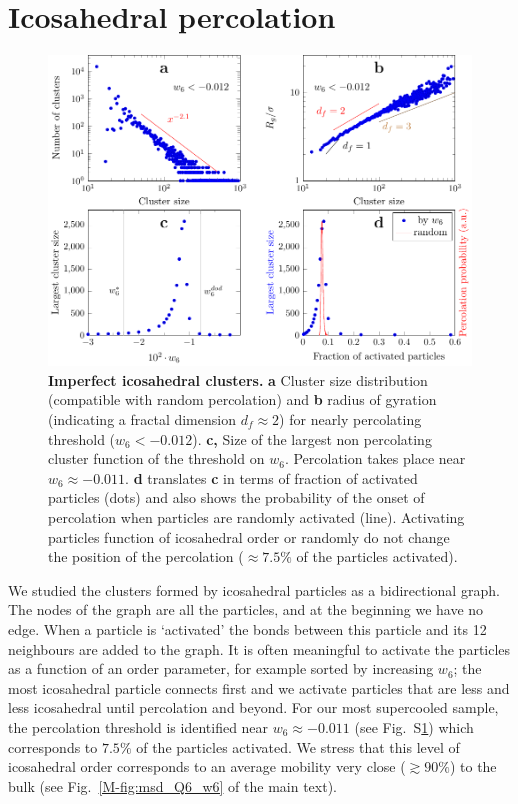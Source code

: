 \documentclass[prl,twocolumn,notitlepage]{revtex4-1}
\begin{document}
\section*{Icosahedral percolation}

\begin{figure}
\begin{center}
\includegraphics{generate_figures-figure7.pdf}
\end{center}
	\caption{\textbf{Imperfect icosahedral clusters.} \textbf{a} Cluster size distribution (compatible with random percolation) and \textbf{b} radius of gyration (indicating a fractal dimension $d_f\approx 2$) for nearly percolating threshold ($w_6<-0.012$). \textbf{c,} Size of the largest non percolating cluster function of the threshold on $w_6$. Percolation takes place near $w_6\approx -0.011$. \textbf{d} translates \textbf{c} in terms of fraction of activated particles (dots) and also shows the probability of the onset of percolation when particles are randomly activated (line). Activating particles function of icosahedral order or randomly do not change the position of the percolation ($\approx7.5\%$ of the particles activated).}
	\label{fig:percolation}
\end{figure}

We studied the clusters formed by icosahedral particles as a bidirectional graph. The nodes of the graph are all the particles, and at the beginning we have no edge. When a particle is `activated' the bonds between this particle and its 12 neighbours are added to the graph. It is often meaningful to activate the particles as a function of an order parameter, for example sorted by increasing $w_6$; the most icosahedral particle connects first and we activate particles that are less and less icosahedral until percolation and beyond. For our most supercooled sample, the percolation threshold is identified near $w_6\approx -0.011$ (see Fig.~S\ref{fig:percolation}) which corresponds to $7.5\%$ of the particles activated. We stress that this level of icosahedral order corresponds to an average mobility very close ($\gtrsim 90\%$) to the bulk (see Fig.~\ref{M-fig:msd_Q6_w6} of the main text).
\end{document}
